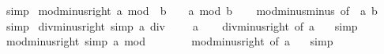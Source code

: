 \begin{isabellebody}
\ simp%
\endisatagproof
{\isafoldproof}%
%
\isadelimproof
\isanewline
%
\endisadelimproof
\isanewline
{}\isamarkupfalse%
\ mod{\isacharunderscore}{\kern0pt}minus{\isacharunderscore}{\kern0pt}right{\isacharcolon}{\kern0pt}\ {\isachardoublequoteopen}a\ mod\ {\isacharparenleft}{\kern0pt}{\isacharminus}{\kern0pt}\ b{\isacharparenright}{\kern0pt}\ {\isacharequal}{\kern0pt}\ {\isacharminus}{\kern0pt}\ {\isacharparenleft}{\kern0pt}{\isacharparenleft}{\kern0pt}{\isacharminus}{\kern0pt}\ a{\isacharparenright}{\kern0pt}\ mod\ b{\isacharparenright}{\kern0pt}{\isachardoublequoteclose}\isanewline
%
\isadelimproof
\ \ %
\endisadelimproof
%
\isatagproof
{}\isamarkupfalse%
\ mod{\isacharunderscore}{\kern0pt}minus{\isacharunderscore}{\kern0pt}minus\ {\isacharbrackleft}{\kern0pt}of\ {\isachardoublequoteopen}{\isacharminus}{\kern0pt}\ a{\isachardoublequoteclose}\ b{\isacharbrackright}{\kern0pt}\ \isamarkupfalse%
\ simp%
\endisatagproof
{\isafoldproof}%
%
\isadelimproof
\isanewline
%
\endisadelimproof
\isanewline
{}\isamarkupfalse%
\ div{\isacharunderscore}{\kern0pt}minus{}{\isacharunderscore}{\kern0pt}right\ {\isacharbrackleft}{\kern0pt}simp{\isacharbrackright}{\kern0pt}{\isacharcolon}{\kern0pt}\ {\isachardoublequoteopen}a\ div\ {\isacharparenleft}{\kern0pt}{\isacharminus}{\kern0pt}\ {}{\isacharparenright}{\kern0pt}\ {\isacharequal}{\kern0pt}\ {\isacharminus}{\kern0pt}\ a{\isachardoublequoteclose}\isanewline
%
\isadelimproof
\ \ %
\endisadelimproof
%
\isatagproof
{}\isamarkupfalse%
\ div{\isacharunderscore}{\kern0pt}minus{\isacharunderscore}{\kern0pt}right\ {\isacharbrackleft}{\kern0pt}of\ a\ {}{\isacharbrackright}{\kern0pt}\ \isamarkupfalse%
\ simp%
\endisatagproof
{\isafoldproof}%
%
\isadelimproof
\isanewline
%
\endisadelimproof
\isanewline
{}\isamarkupfalse%
\ mod{\isacharunderscore}{\kern0pt}minus{}{\isacharunderscore}{\kern0pt}right\ {\isacharbrackleft}{\kern0pt}simp{\isacharbrackright}{\kern0pt}{\isacharcolon}{\kern0pt}\ {\isachardoublequoteopen}a\ mod\ {\isacharparenleft}{\kern0pt}{\isacharminus}{\kern0pt}\ {}{\isacharparenright}{\kern0pt}\ {\isacharequal}{\kern0pt}\ {}{\isachardoublequoteclose}\isanewline
%
\isadelimproof
\ \ %
\endisadelimproof
%
\isatagproof
{}\isamarkupfalse%
\ mod{\isacharunderscore}{\kern0pt}minus{\isacharunderscore}{\kern0pt}right\ {\isacharbrackleft}{\kern0pt}of\ a\ {}{\isacharbrackright}{\kern0pt}\ \isamarkupfalse%
\ simp%

\end{isabellebody}

